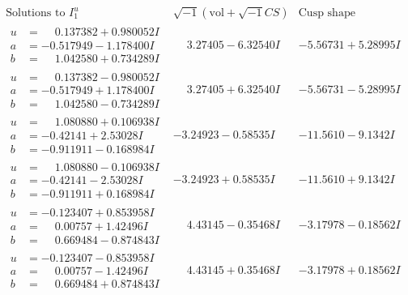 \documentclass[1p]{elsarticle_modified}
\theoremstyle{definition}
\newcommand{\I}{\sqrt{-1}}
\begin{document}
$$\begin{array}{c|c|c}  
\text{Solutions to }I^u_{1}& \I (\text{vol} + \sqrt{-1}CS) & \text{Cusp shape}\\
 \hline 
\begin{aligned}
u &= \phantom{-}0.137382 + 0.980052 I \\
a &= -0.517949 - 1.178400 I \\
b &= \phantom{-}1.042580 + 0.734289 I\end{aligned}
 & \phantom{-}3.27405 - 6.32540 I & -5.56731 + 5.28995 I \\ \hline\begin{aligned}
u &= \phantom{-}0.137382 - 0.980052 I \\
a &= -0.517949 + 1.178400 I \\
b &= \phantom{-}1.042580 - 0.734289 I\end{aligned}
 & \phantom{-}3.27405 + 6.32540 I & -5.56731 - 5.28995 I \\ \hline\begin{aligned}
u &= \phantom{-}1.080880 + 0.106938 I \\
a &= -0.42141 + 2.53028 I \\
b &= -0.911911 - 0.168984 I\end{aligned}
 & -3.24923 - 0.58535 I & -11.5610 - 9.1342 I \\ \hline\begin{aligned}
u &= \phantom{-}1.080880 - 0.106938 I \\
a &= -0.42141 - 2.53028 I \\
b &= -0.911911 + 0.168984 I\end{aligned}
 & -3.24923 + 0.58535 I & -11.5610 + 9.1342 I \\ \hline\begin{aligned}
u &= -0.123407 + 0.853958 I \\
a &= \phantom{-}0.00757 + 1.42496 I \\
b &= \phantom{-}0.669484 - 0.874843 I\end{aligned}
 & \phantom{-}4.43145 - 0.35468 I & -3.17978 - 0.18562 I \\ \hline\begin{aligned}
u &= -0.123407 - 0.853958 I \\
a &= \phantom{-}0.00757 - 1.42496 I \\
b &= \phantom{-}0.669484 + 0.874843 I\end{aligned}
 & \phantom{-}4.43145 + 0.35468 I & -3.17978 + 0.18562 I \\ \hline\begin{aligned}

\end{aligned}
\end{array}$$
\end{document}
